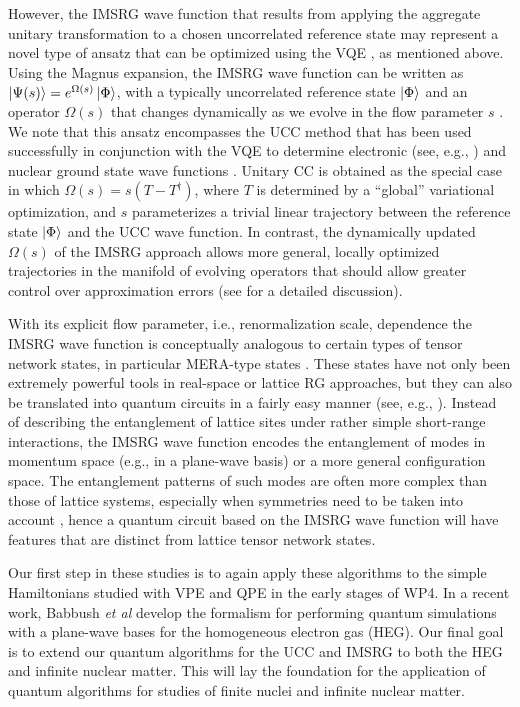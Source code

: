 \documentclass[11pt]{article}
\begin{document}
However, the IMSRG wave function that results from applying the aggregate unitary transformation to a chosen uncorrelated reference state may represent a novel type of ansatz that can be optimized using the VQE \cite{Dawson:2008td}, as mentioned above. Using the Magnus expansion, the IMSRG wave function can be written as $\ket{\Psi(s)}=e^{\Omega(s)}\ket{\Phi}$, with a typically uncorrelated reference state $\ket{\Phi}$ and an operator $\Omega(s)$ that changes dynamically as we evolve in the flow parameter $s$ \cite{Morris:2015ve}. We note that this ansatz encompasses the UCC method that has been used successfully in conjunction with the VQE to determine electronic (see, e.g., \cite{Wecker:2015bk,McClean:2016qr,Lee:2019dd}) and nuclear ground state wave functions \cite{Dumitrescu:2018az,Lu:2018aq}. Unitary CC is obtained as the special case in which $\Omega(s)=s(T-T^{\dag})$, where $T$ is determined by a ``global'' variational optimization, and $s$ parameterizes a trivial linear trajectory between the reference state $\ket{\Phi}$ and the UCC wave function. In contrast, the dynamically updated $\Omega(s)$ of the IMSRG approach allows more general, locally optimized trajectories in the manifold of evolving operators that should allow greater control over approximation errors (see \cite{Hergert:2017kx} for a detailed discussion).

With its explicit flow parameter, i.e., renormalization scale, dependence the IMSRG wave function is conceptually analogous to certain types of tensor network states, in particular MERA-type states \cite{kim2017robust,Vidal:2007if,Evenbly:2015ht,Evenbly:2015bq,Dawson:2008td}. These states have not only been extremely powerful tools in real-space or lattice RG approaches, but they can also be translated into quantum circuits in a fairly easy manner (see, e.g., \cite{Dawson:2008td}). Instead of describing the entanglement of lattice sites under rather simple short-range interactions, the IMSRG wave function encodes the entanglement of modes in momentum space (e.g., in a plane-wave basis) or a more general configuration space. The entanglement patterns of such modes are often more complex than those of lattice systems, especially when symmetries need to be taken into account \cite{Legeza:2015la}, hence a quantum circuit based on the IMSRG wave function will have features that are distinct from lattice tensor network states. 

Our first step in these studies is to again apply these algorithms to the simple Hamiltonians studied with VPE and QPE in the early stages of WP4.  In a recent work, Babbush {\em et al} develop the formalism for performing quantum simulations with a plane-wave bases \cite{Babbush:2018wy} for the homogeneous electron gas (HEG). Our final goal is to extend our quantum algorithms for the UCC and IMSRG  to both the HEG and infinite nuclear matter. This will lay the foundation for the application of quantum algorithms for studies of finite nuclei and infinite nuclear matter. 
\end{document}
